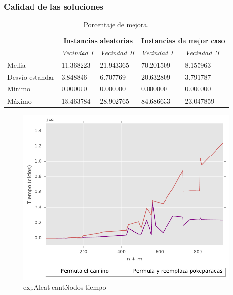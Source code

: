 \subsubsection{Calidad de las soluciones}

\begin{table}[H]
    \begin{center}
        \begin{tabular}{ | l | l | l | l | l | }
            \hline
            \multicolumn{1}{|c|}{}&
            \multicolumn{2}{|c|}{\textbf{Instancias aleatorias}}&
            \multicolumn{2}{|c|}{\textbf{Instancias de mejor caso}}\\
            \cline{2-5}
                            &    \textit{Vecindad I}     &    \textit{Vecindad II}    &    \textit{Vecindad I}     &    \textit{Vecindad II}    \\ \hline
            Media           &    11.368223  &   21.943365   &   70.201509   &    8.155963   \\ \hline
            Desv\'io estandar       &   3.848846    &    6.707769   &   20.632809   &   3.791787    \\ \hline
            M\'inimo        &   0.000000    &    0.000000   &   0.000000    &   0.000000    \\ \hline
            M\'aximo        &   18.463784   &    28.902765  &       84.686633   &    23.047859  \\ \hline
        \end{tabular}
    \end{center}
    \caption{Porcentaje de mejora.}    
    \label{table:porcentaje_mejora}
\end{table} 

\begin{figure}[H]
  \begin{center}
    \includegraphics{../experimentacion/ej3/expAleat_cantNodos_tiempo.pdf}
    \caption{expAleat cantNodos tiempo}
    \label{fig:expAleat_cantNodos_tiempo}
  \end{center}
\end{figure}

